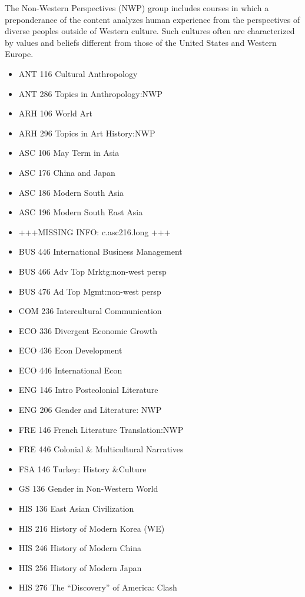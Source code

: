 \documentclass[
  letterpaper,
]{scrbook}
\begin{document}
The Non-Western Perspectives (NWP) group includes courses in which a
preponderance of the content analyzes human experience from the
perspectives of diverse peoples outside of Western culture. Such
cultures often are characterized by values and beliefs different from
those of the United States and Western Europe.

\begin{itemize}
\item
  ANT 116 Cultural Anthropology
\item
  ANT 286 Topics in Anthropology:NWP
\item
  ARH 106 World Art
\item
  ARH 296 Topics in Art History:NWP
\item
  ASC 106 May Term in Asia
\item
  ASC 176 China and Japan
\item
  ASC 186 Modern South Asia
\item
  ASC 196 Modern South East Asia
\item
  +++MISSING INFO: c.asc216.long +++
\item
  BUS 446 International Business Management
\item
  BUS 466 Adv Top Mrktg:non-west persp
\item
  BUS 476 Ad Top Mgmt:non-west persp
\item
  COM 236 Intercultural Communication
\item
  ECO 336 Divergent Economic Growth
\item
  ECO 436 Econ Development
\item
  ECO 446 International Econ
\item
  ENG 146 Intro Postcolonial Literature
\item
  ENG 206 Gender and Literature: NWP
\item
  FRE 146 French Literature Translation:NWP
\item
  FRE 446 Colonial \& Multicultural Narratives
\item
  FSA 146 Turkey: History \&Culture
\item
  GS 136 Gender in Non-Western World
\item
  HIS 136 East Asian Civilization
\item
  HIS 216 History of Modern Korea (WE)
\item
  HIS 246 History of Modern China
\item
  HIS 256 History of Modern Japan
\item
  HIS 276 The ``Discovery'' of America: Clash

\end{itemize}
\end{document}
